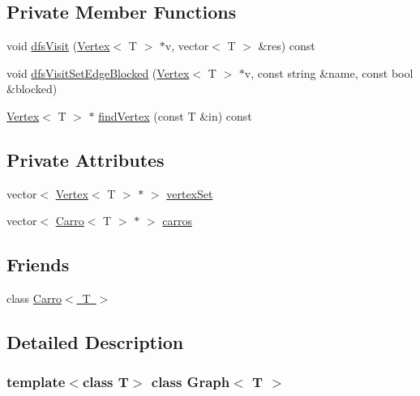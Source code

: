 \subsection*{Private Member Functions}
\begin{DoxyCompactItemize}
\item 
void \mbox{\hyperlink{class_graph_ab2bb8011642e0d5e6a71e0981d661056}{dfs\+Visit}} (\mbox{\hyperlink{class_vertex}{Vertex}}$<$ T $>$ $\ast$v, vector$<$ T $>$ \&res) const
\item 
void \mbox{\hyperlink{class_graph_ace4fd677f4a349f2d1e51c8aeac44d0d}{dfs\+Visit\+Set\+Edge\+Blocked}} (\mbox{\hyperlink{class_vertex}{Vertex}}$<$ T $>$ $\ast$v, const string \&name, const bool \&blocked)
\item 
\mbox{\hyperlink{class_vertex}{Vertex}}$<$ T $>$ $\ast$ \mbox{\hyperlink{class_graph_a8b7b7465fbfd562e2a469f90a437ab75}{find\+Vertex}} (const T \&in) const
\end{DoxyCompactItemize}
\subsection*{Private Attributes}
\begin{DoxyCompactItemize}
\item 
vector$<$ \mbox{\hyperlink{class_vertex}{Vertex}}$<$ T $>$ $\ast$ $>$ \mbox{\hyperlink{class_graph_a73d4e735fc0a7c83c9c689a2b53fa623}{vertex\+Set}}
\item 
vector$<$ \mbox{\hyperlink{class_carro}{Carro}}$<$ T $>$ $\ast$ $>$ \mbox{\hyperlink{class_graph_a4373274a6678e1b3a456f2ba32e64d69}{carros}}
\end{DoxyCompactItemize}
\subsection*{Friends}
\begin{DoxyCompactItemize}
\item 
class \mbox{\hyperlink{class_graph_a78ed93177388d46d6f2e49b58f59e95e}{Carro$<$ T $>$}}
\end{DoxyCompactItemize}


\subsection{Detailed Description}
\subsubsection*{template$<$class T$>$\newline
class Graph$<$ T $>$}

